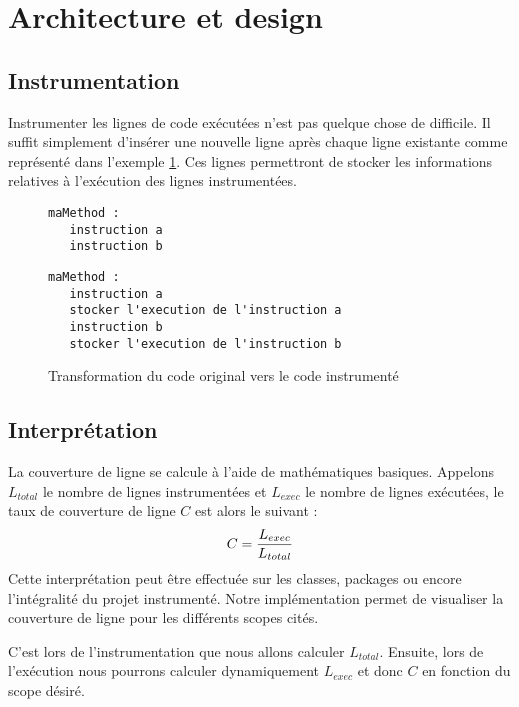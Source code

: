 \section{Architecture et design}

\subsection{Instrumentation}
\label{instrumentation}

Instrumenter les lignes de code exécutées n'est pas quelque chose de difficile. Il suffit simplement d'insérer une nouvelle ligne après chaque ligne existante comme représenté dans l'exemple   \ref{example_instrumentation}. Ces lignes permettront de stocker les informations relatives à l'exécution des lignes instrumentées.

\begin{figure}[h]

\begin{minipage}{.45\linewidth}

\begin{lstlisting}[linewidth=5.0cm]
maMethod :		
   instruction a
   instruction b
\end{lstlisting}

\end{minipage}
\hfill
\begin{minipage}{.45\linewidth}

\begin{lstlisting}[linewidth=11cm]
maMethod :
   instruction a
   stocker l'execution de l'instruction a
   instruction b
   stocker l'execution de l'instruction b
\end{lstlisting}

\end{minipage}


\caption{Transformation du code original vers le code instrumenté}
\label{example_instrumentation}
\end{figure}

\subsection{Interprétation}
\label{interpretation}

La couverture de ligne se calcule à l'aide de mathématiques basiques. Appelons $L_{total}$ le nombre de lignes instrumentées et $L_{exec}$ le nombre de lignes exécutées, le taux de couverture de ligne $C$ est alors le suivant :
\begin{equation}
C = { L_{exec} \over L_{total} }
\end{equation}
Cette interprétation peut être effectuée sur les classes, packages ou encore l'intégralité du projet instrumenté. Notre implémentation permet de visualiser la couverture de ligne pour les différents scopes cités.
\par C'est lors de l'instrumentation que nous allons calculer $L_{total}$. Ensuite, lors de l'exécution nous pourrons calculer dynamiquement $L_{exec}$ et donc $C$ en fonction du scope désiré.

